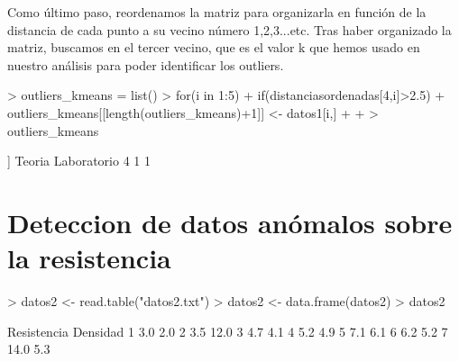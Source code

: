 \documentclass [a4paper] {article}
\begin{document}
Como último paso, reordenamos la matriz para organizarla en función de la distancia
de cada punto a su vecino número 1,2,3...etc. Tras haber organizado la matriz, buscamos en el tercer
vecino, que es el valor k que hemos usado en nuestro análisis para poder identificar los outliers.
\begin{Schunk}
\begin{Sinput}
> outliers_kmeans = list()
> for(i in 1:5){
+   if(distanciasordenadas[4,i]>2.5){
+     outliers_kmeans[[length(outliers_kmeans)+1]] <- datos1[i,]
+   }
+ }
> outliers_kmeans
\end{Sinput}
\begin{Soutput}
[[1]]
  Teoria Laboratorio
4      1           1
\end{Soutput}
\end{Schunk}



\section{Deteccion de datos anómalos sobre la resistencia }

\begin{Schunk}
\begin{Sinput}
> datos2 <- read.table("datos2.txt")
> datos2 <- data.frame(datos2)
> datos2
\end{Sinput}
\begin{Soutput}
  Resistencia Densidad
1         3.0      2.0
2         3.5     12.0
3         4.7      4.1
4         5.2      4.9
5         7.1      6.1
6         6.2      5.2
7        14.0      5.3
\end{Soutput}
\end{Schunk}
\end{document}
